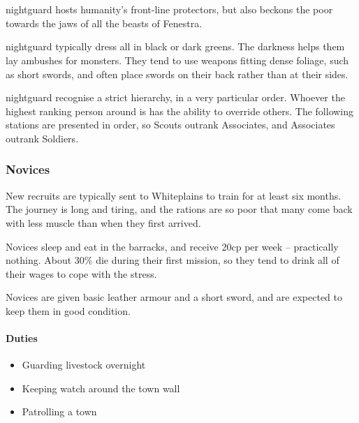 \chapter{}

\label{nightguard}

\begin{multicols}{2}

\noindent
\Gls{nightguard} hosts humanity's front-line protectors, but also beckons the poor towards the jaws of all the beasts of Fenestra.

\Gls{nightguard} typically dress all in black or dark greens.
The darkness helps them lay ambushes for monsters.
They tend to use weapons fitting dense foliage, such as short swords, and often place swords on their back rather than at their sides.

\Gls{nightguard} recognise a strict hierarchy, in a very particular order.
Whoever the highest ranking person around is has the ability to override others.
The following stations are presented in order, so Scouts outrank Associates, and Associates outrank Soldiers.

\subsection{Novices}

New recruits are typically sent to Whiteplains to train for at least six months.
The journey is long and tiring, and the rations are so poor that many come back with less muscle than when they first arrived.

Novices sleep and eat in the barracks, and receive 20cp per week -- practically nothing.
About 30\% die during their first mission, so they tend to drink all of their wages to cope with the stress.

Novices are given basic leather armour and a short sword, and are expected to keep them in good condition.

\subsubsection{Duties}

\begin{itemize}

	\item{Guarding livestock overnight}
	\item{Keeping watch around the town wall}
	\item{Patrolling a town}
\end{itemize}


\end{multicols}
